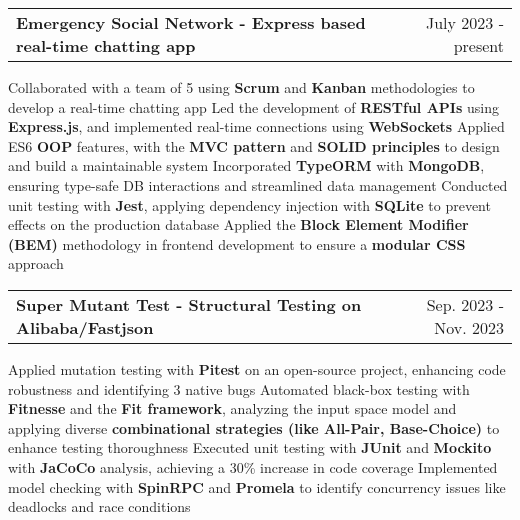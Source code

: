 \newcommand{\resumeProjEntry}[2]{
    \vspace{5pt}\item
      \begin{tabular*}{0.97\textwidth}{l@{\extracolsep{\fill}}r}
        \textbf{#1} & \small #2\\
      \end{tabular*}\vspace{-5pt}
}

\resumeProjEntry
{Emergency Social Network - Express based real-time chatting app}
{July 2023 - present}
{
    \resumeItemListStart
        \resumeItem
        {Collaborated with a team of 5 using \textbf{Scrum} and \textbf{Kanban} methodologies to develop a real-time chatting app}
        \resumeItem
        {Led the development of \textbf{RESTful APIs} using \textbf{Express.js}, and implemented real-time connections using \textbf{WebSockets}}
        \resumeItem
        {Applied ES6 \textbf{OOP} features, with the \textbf{MVC pattern} and \textbf{SOLID principles} to design and build a maintainable system}
        \resumeItem
        {Incorporated \textbf{TypeORM} with \textbf{MongoDB}, ensuring type-safe DB interactions and streamlined data management}
        \resumeItem
        {Conducted unit testing with \textbf{Jest}, applying dependency injection with \textbf{SQLite} to prevent effects on the production database}
        \resumeItem
        {Applied the \textbf{Block Element Modifier (BEM)} methodology in frontend development to ensure a \textbf{modular CSS} approach}
    \resumeItemListEnd
}


\resumeProjEntry
{Super Mutant Test - Structural Testing on Alibaba/Fastjson}
{Sep. 2023 - Nov. 2023}
{
    \resumeItemListStart
        \resumeItem
        {Applied mutation testing with \textbf{Pitest} on an open-source project, enhancing code robustness and identifying 3 native bugs}
        \resumeItem
        {Automated black-box testing with \textbf{Fitnesse} and the \textbf{Fit framework}, analyzing the input space model and applying diverse \textbf{combinational strategies (like All-Pair, Base-Choice)} to enhance testing thoroughness}
        \resumeItem
        {Executed unit testing with \textbf{JUnit} and \textbf{Mockito} with \textbf{JaCoCo} analysis, achieving a 30\% increase in code coverage}
        \resumeItem
        {Implemented model checking with \textbf{SpinRPC} and \textbf{Promela} to identify concurrency issues like deadlocks and race conditions}
    \resumeItemListEnd

}

